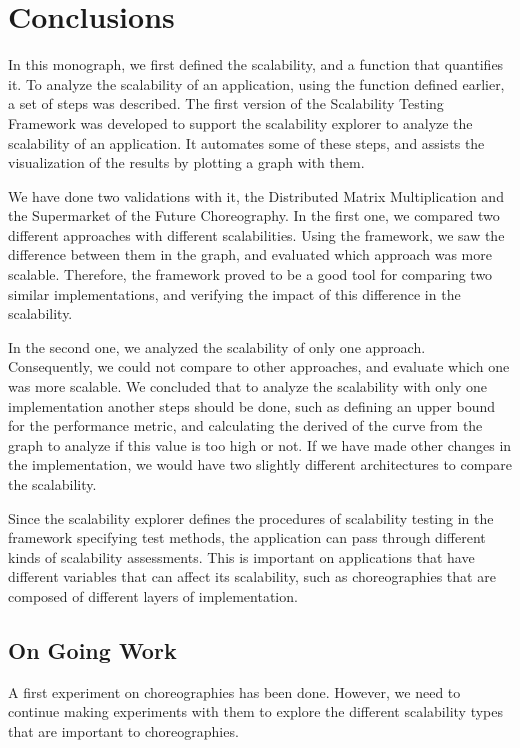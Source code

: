\section{Conclusions}

In this monograph, we first defined the scalability, and a function that quantifies it. To analyze the scalability of an application, using the function defined earlier, a set of steps was described. The first version of the Scalability Testing Framework was developed to support the scalability explorer to analyze the scalability of an application. It automates some of these steps, and assists the visualization of the results by plotting a graph with them.

We have done two validations with it, the Distributed Matrix Multiplication and the Supermarket of the Future Choreography. In the first one, we compared two different approaches with different scalabilities. Using the framework, we saw the difference between them in the graph, and evaluated which approach was more scalable. Therefore, the framework proved to be a good tool for comparing two similar implementations, and verifying the impact of this difference in the scalability.

In the second one, we analyzed the scalability of only one approach. Consequently, we could not compare to other approaches, and evaluate which one was more scalable. We concluded that to analyze the scalability with only one implementation another steps should be done, such as defining an upper bound for the performance metric, and calculating the derived of the curve from the graph to analyze if this value is too high or not. If we have made other changes in the implementation, we would have two slightly different architectures to compare the scalability. 

Since the scalability explorer defines the procedures of scalability testing in the framework specifying test methods, the application can pass through different kinds of scalability assessments. This is important on applications that have different variables that can affect its scalability, such as choreographies that are composed of different layers of implementation.

\subsection{On Going Work}

A first experiment on choreographies has been done. However, we need to continue making experiments with them to explore the different scalability types that are important to choreographies. 

